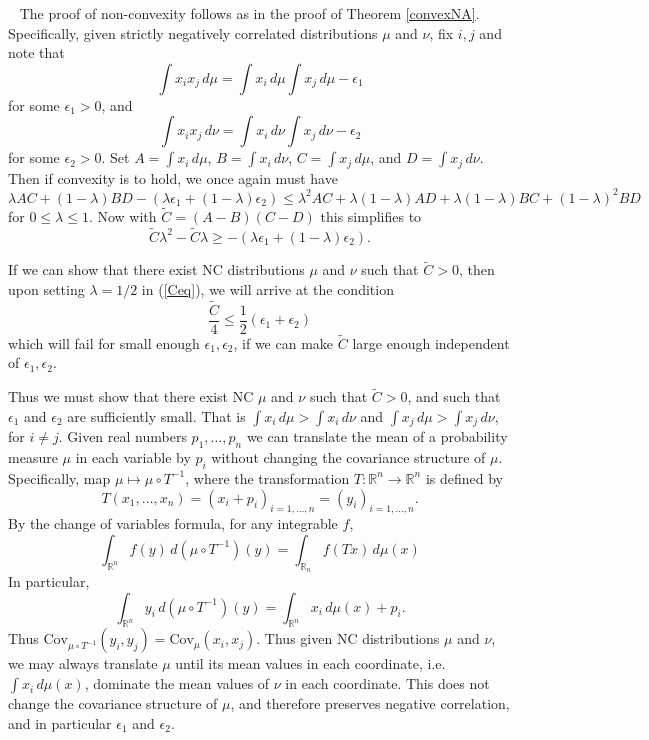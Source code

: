 \documentclass[11pt]{article}
\newcommand{\R}{\mathbb{R}}
\newcommand{\C}{\text{Cov}}
\newenvironment{Proof}{\noindent{\bf Proof} \ }{\QED}\smallskip
\newcommand\QED{\newline \rightline{$\blacksquare$} \bigskip}
\begin{document}
\begin{Proof}
The proof of non-convexity follows as in the proof of Theorem \ref{convexNA}. Specifically, 
given strictly negatively correlated distributions $\mu$ and $\nu$, fix $i,j$ and note that 
\[
\int x_ix_j \, d\mu = \int x_i \, d\mu \int x_j \, d\mu -\epsilon_1
\]
for some $\epsilon_1>0$, and 
\[
\int x_ix_j \, d\nu = \int x_i \, d\nu \int x_j \, d\nu -\epsilon_2
\]
for some $\epsilon_2>0$.
Set $A= \int x_i\, d\mu$, $B= \int x_i \, d\nu$, $C= \int x_j \, d\mu$,
and $D = \int x_j\, d\nu$. Then if convexity is to hold, we once again must have
\[
\lambda AC +(1-\lambda)BD
-(\lambda\epsilon_1+(1-\lambda)\epsilon_2)
\leq \lambda^2 AC + \lambda(1-\lambda)AD
+\lambda(1-\lambda)BC + (1-\lambda)^2BD
\]
for $0\leq \lambda \leq 1.$ Now with $\tilde{C}=(A-B)(C-D)$ this simplifies to 
\begin{equation}\label{Ceq}
\tilde{C}\lambda^2-\tilde{C}\lambda \geq -(\lambda \epsilon_1+(1-\lambda)\epsilon_2).
\end{equation}

If we can show that there exist NC distributions $\mu$ and $\nu$ such that $\tilde{C}>0$, then upon setting $\lambda = 1/2$ in (\ref{Ceq}), we will arrive at the condition 
\[
\frac{\tilde{C}}{4} \leq \frac{1}{2}(\epsilon_1+\epsilon_2)
\]
which will fail for small enough $\epsilon_1,\epsilon_2$, if we can make $\tilde{C}$ large enough independent of $\epsilon_1,\epsilon_2$. %

Thus we must show that there exist NC $\mu$ and $\nu$ such that $\tilde{C}>0$, and such that $\epsilon_1$ and $\epsilon_2$ are sufficiently small. That is 
$\int x_i\, d\mu > \int x_i\, d\nu$ and $\int x_j\, d\mu>\int x_j\, d\nu$, for $i\neq j$. Given real numbers $p_1,\dots, p_n$ we can translate the mean of a probability measure $\mu$ in each variable by $p_i$ without changing the covariance structure of $\mu$. Specifically, map $\mu\mapsto \mu\circ T^{-1}$, where the transformation $T:\R^n\to \R^n$ is defined by 
\[
T(x_1,\dots, x_n) = (x_i+p_i)_{i=1,\dots,n} =(y_i)_{i=1,\dots,n}.
\]
By the change of variables formula, for any integrable $f$,
\[
\int_{\R^n} f(y) \, d(\mu\circ T^{-1})(y) = 
\int_{\R_n} f(Tx) \,d\mu(x) 
\]
In particular,
\[
\int_{\R^n} y_i \, d(\mu\circ T^{-1})(y) = \int_{\R^n}x_i\, d\mu(x) + p_i.
\]
Thus $\C_{\mu\circ T^{-1}}(y_i,y_j) = \C_{\mu}(x_i,x_j)$. Thus given NC distributions $\mu$ and $\nu$, we may always translate $\mu$ until its mean values in each coordinate, i.e. $\int x_i \, d\mu(x)$, dominate the mean values of $\nu$ in each coordinate. This does not change the covariance structure of $\mu$, and therefore preserves negative correlation, and in particular $\epsilon_1$ and $\epsilon_2$.


\end{Proof}
\end{document}
